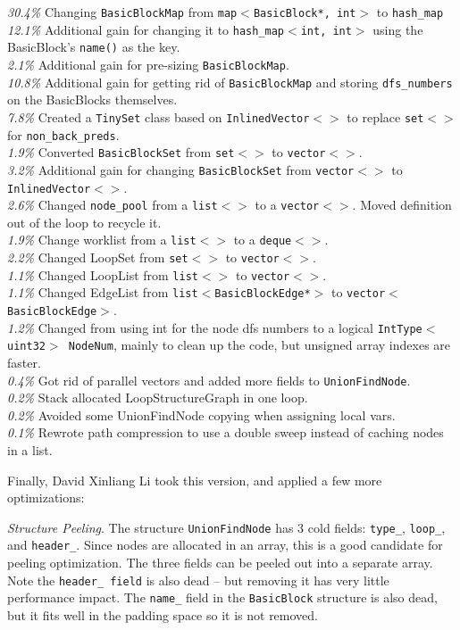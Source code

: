{\em 30.4\%}  Changing {\tt BasicBlockMap} from {\tt map$<$BasicBlock*, int$>$} to {\tt hash\_map} \\
{\em 12.1\%}  Additional gain for changing it to {\tt hash\_map$<$int, int$>$} using the  BasicBlock's {\tt name()} as the key. \\
{\em  2.1\%}  Additional gain for pre-sizing {\tt BasicBlockMap}. \\
{\em 10.8\%}  Additional gain for getting rid of {\tt BasicBlockMap} and storing {\tt dfs\_numbers} on the BasicBlocks themselves. \\
{\em  7.8\%}  Created a {\tt TinySet} class based on {\tt InlinedVector$<>$} to replace {\tt set$<>$} for {\tt non\_back\_preds}. \\
{\em  1.9\%}  Converted {\tt BasicBlockSet} from {\tt set$<>$} to {\tt vector$<>$}. \\
{\em  3.2\%}  Additional gain for changing {\tt BasicBlockSet} from {\tt vector$<>$} to {\tt InlinedVector$<>$}. \\
{\em  2.6\%}  Changed {\tt node\_pool} from a {\tt list$<>$} to a {\tt vector$<>$}.  Moved definition  out of the loop to recycle it. \\
{\em  1.9\%}  Change worklist from a {\tt list$<>$} to a {\tt deque$<>$}. \\
{\em  2.2\%}  Changed LoopSet from {\tt set$<>$} to {\tt vector$<>$}. \\
{\em  1.1\%}  Changed LoopList from {\tt list$<>$} to {\tt vector$<>$}. \\
{\em  1.1\%}  Changed EdgeList from {\tt list$<$BasicBlockEdge*$>$} to {\tt vector$<$BasicBlockEdge$>$}. \\
{\em  1.2\%}  Changed from using int for the node dfs numbers to a logical {\tt IntType$<$uint32$>$ NodeNum}, mainly to clean up the code, but unsigned  array indexes are faster. \\
{\em  0.4\%}  Got rid of parallel vectors and added more fields to {\tt UnionFindNode}. \\
{\em  0.2\%}  Stack allocated LoopStructureGraph in one loop. \\
{\em  0.2\%}  Avoided some UnionFindNode copying when assigning local vars. \\
{\em  0.1\%}  Rewrote path compression to use a double sweep instead of  caching nodes in a list.

Finally, David Xinliang Li took this version, and applied a few more optimizations:

{\em Structure Peeling}. The structure {\tt UnionFindNode} has 3
  cold fields: {\tt type\_}, {\tt loop\_}, and {\tt header\_}.  Since nodes are allocated
  in an array, this is a good candidate for peeling optimization.
  The three fields can be peeled out into a separate array. Note the
  {\tt header\_ field} is also dead -- but removing it has very little
  performance impact.  The {\tt name\_} field in the {\tt BasicBlock} structure is also
  dead, but it fits well in the padding space so it is not removed.

